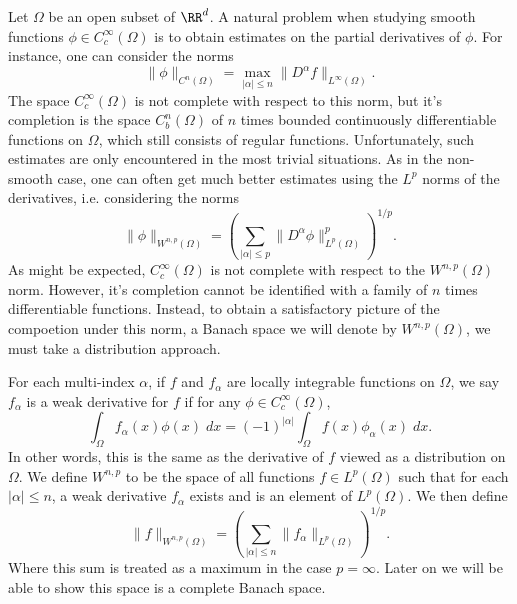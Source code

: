 Let $\Omega$ be an open subset of $\RR^d$. A natural problem when studying smooth functions $\phi \in C_c^\infty(\Omega)$ is to obtain estimates on the partial derivatives of $\phi$. For instance, one can consider the norms
%
\[ \| \phi \|_{C^n(\Omega)} = \max_{|\alpha| \leq n} \| D^\alpha f \|_{L^\infty(\Omega)}. \]
%
The space $C_c^\infty(\Omega)$ is not complete with respect to this norm, but it's completion is the space $C^n_b(\Omega)$ of $n$ times bounded continuously differentiable functions on $\Omega$, which still consists of regular functions. Unfortunately, such estimates are only encountered in the most trivial situations. As in the non-smooth case, one can often get much better estimates using the $L^p$ norms of the derivatives, i.e. considering the norms
%
\[ \| \phi \|_{W^{n,p}(\Omega)} = \left( \sum_{|\alpha| \leq p} \| D^\alpha \phi \|_{L^p(\Omega)}^p \right)^{1/p}. \]
%
As might be expected, $C_c^\infty(\Omega)$ is not complete with respect to the $W^{n,p}(\Omega)$ norm. However, it's completion cannot be identified with a family of $n$ times differentiable functions. Instead, to obtain a satisfactory picture of the compoetion under this norm, a Banach space we will denote by $W^{n,p}(\Omega)$, we must take a distribution approach.

For each multi-index $\alpha$, if $f$ and $f_\alpha$ are locally integrable functions on $\Omega$, we say $f_\alpha$ is a weak derivative for $f$ if for any $\phi \in C_c^\infty(\Omega)$,
%
\[ \int_\Omega f_\alpha(x) \phi(x)\; dx = (-1)^{|\alpha|} \int_\Omega f(x) \phi_\alpha(x)\; dx. \]
%
In other words, this is the same as the derivative of $f$ viewed as a distribution on $\Omega$. We define $W^{n,p}$ to be the space of all functions $f \in L^p(\Omega)$ such that for each $|\alpha| \leq n$, a weak derivative $f_\alpha$ exists and is an element of $L^p(\Omega)$. We then define
%
\[ \| f \|_{W^{n,p}(\Omega)} = \left( \sum_{|\alpha| \leq n} \| f_\alpha \|_{L^p(\Omega)} \right)^{1/p}. \]
%
Where this sum is treated as a maximum in the case $p = \infty$. Later on we will be able to show this space is a complete Banach space.

